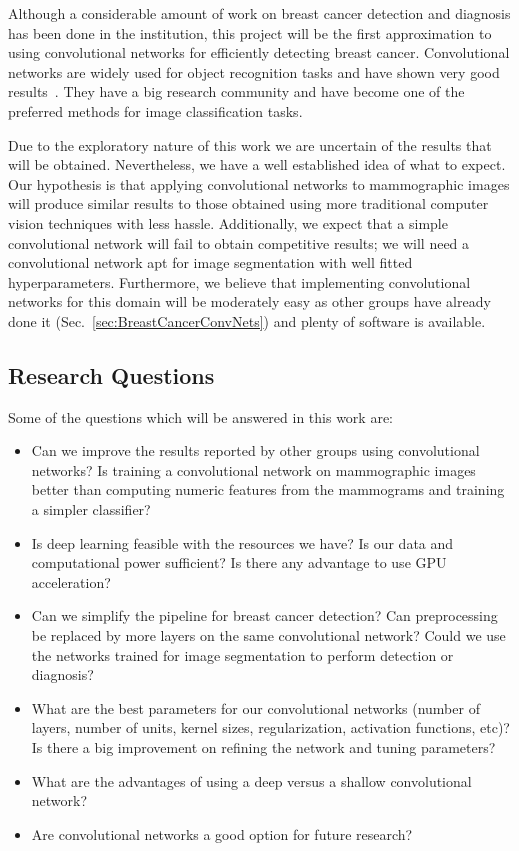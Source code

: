 Although a considerable amount of work on breast cancer detection and diagnosis has been done in the institution, this project will be the first approximation to using convolutional networks for efficiently detecting breast cancer. Convolutional networks are widely used for object recognition tasks and have shown very good results~\cite{Russakovsky2015, Taigman2014, Dieleman2015}. They have a big research community and have become one of the preferred methods for image classification tasks.

Due to the exploratory nature of this work we are uncertain of the results that will be obtained. Nevertheless, we have a well established idea of what to expect. Our hypothesis is that applying convolutional networks to mammographic images will produce similar results to those obtained using more traditional computer vision techniques with less hassle. Additionally, we expect that a simple convolutional network will fail to obtain competitive results; we will need a convolutional network apt for image segmentation with well fitted hyperparameters. Furthermore, we believe that implementing convolutional networks for this domain will be moderately easy as other groups have already done it (Sec.~\ref{sec:BreastCancerConvNets}) and plenty of software is available.

\subsection{Research Questions}
Some of the questions which will be answered in this work are:
\begin{itemize} 
	\item Can we improve the results reported by other groups using convolutional networks? Is training a convolutional network on mammographic images better than computing numeric features from the mammograms and training a simpler classifier?
	\item Is deep learning feasible with the resources we have? Is our data and computational power sufficient? Is there any advantage to use GPU acceleration?
	\item Can we simplify the pipeline for breast cancer detection? Can preprocessing be replaced by more layers on the same convolutional network? Could we use the networks trained for image segmentation to perform detection or diagnosis?
	\item What are the best parameters for our convolutional networks (number of layers, number of units, kernel sizes, regularization, activation functions, etc)? Is there a big improvement on refining the network and tuning parameters?
	\item What are the advantages of using a deep versus a shallow convolutional network? 
	\item Are convolutional networks a good option for future research?
\end{itemize}
